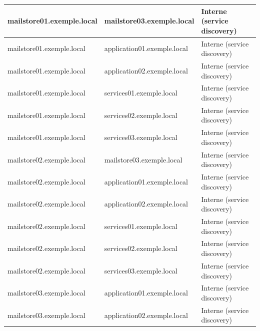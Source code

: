 \documentclass[11pt,a4paper]{report}
\begin{document}
\begin{longtable}{|p{5cm}|p{5cm}|p{5cm}|}
\hline
mailstore01.\allowbreak{}exemple.\allowbreak{}local & mailstore03.\allowbreak{}exemple.\allowbreak{}local & Interne (service discovery) \\
\hline
mailstore01.\allowbreak{}exemple.\allowbreak{}local & application01.\allowbreak{}exemple.\allowbreak{}local & Interne (service discovery) \\
\hline
mailstore01.\allowbreak{}exemple.\allowbreak{}local & application02.\allowbreak{}exemple.\allowbreak{}local & Interne (service discovery) \\
\hline
mailstore01.\allowbreak{}exemple.\allowbreak{}local & services01.\allowbreak{}exemple.\allowbreak{}local & Interne (service discovery) \\
\hline
mailstore01.\allowbreak{}exemple.\allowbreak{}local & services02.\allowbreak{}exemple.\allowbreak{}local & Interne (service discovery) \\
\hline
mailstore01.\allowbreak{}exemple.\allowbreak{}local & services03.\allowbreak{}exemple.\allowbreak{}local & Interne (service discovery) \\
\hline
mailstore02.\allowbreak{}exemple.\allowbreak{}local & mailstore03.\allowbreak{}exemple.\allowbreak{}local & Interne (service discovery) \\
\hline
mailstore02.\allowbreak{}exemple.\allowbreak{}local & application01.\allowbreak{}exemple.\allowbreak{}local & Interne (service discovery) \\
\hline
mailstore02.\allowbreak{}exemple.\allowbreak{}local & application02.\allowbreak{}exemple.\allowbreak{}local & Interne (service discovery) \\
\hline
mailstore02.\allowbreak{}exemple.\allowbreak{}local & services01.\allowbreak{}exemple.\allowbreak{}local & Interne (service discovery) \\
\hline
mailstore02.\allowbreak{}exemple.\allowbreak{}local & services02.\allowbreak{}exemple.\allowbreak{}local & Interne (service discovery) \\
\hline
mailstore02.\allowbreak{}exemple.\allowbreak{}local & services03.\allowbreak{}exemple.\allowbreak{}local & Interne (service discovery) \\
\hline
mailstore03.\allowbreak{}exemple.\allowbreak{}local & application01.\allowbreak{}exemple.\allowbreak{}local & Interne (service discovery) \\
\hline
mailstore03.\allowbreak{}exemple.\allowbreak{}local & application02.\allowbreak{}exemple.\allowbreak{}local & Interne (service discovery) \\

\end{longtable}
\end{document}
